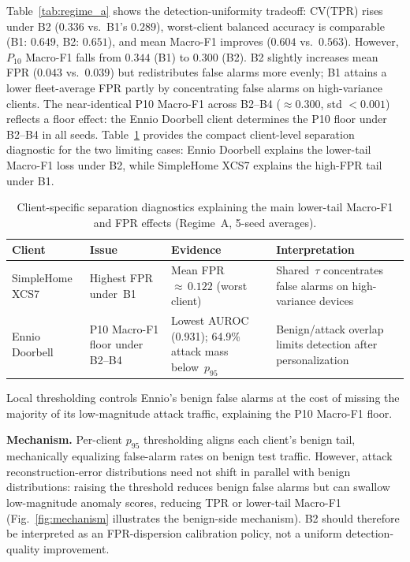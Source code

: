 Table~\ref{tab:regime_a} shows the detection-uniformity tradeoff:
CV(TPR) rises under B2 ($0.336$ vs.\ B1's $0.289$),
worst-client balanced accuracy is comparable (B1: $0.649$, B2: $0.651$),
and mean Macro-F1 improves ($0.604$ vs.\ $0.563$).
However, $P_{10}$ Macro-F1 falls from $0.344$ (B1) to $0.300$ (B2).
B2 slightly increases mean FPR ($0.043$ vs.\ $0.039$) but redistributes
false alarms more evenly; B1 attains a lower fleet-average FPR partly by concentrating
false alarms on high-variance clients.
The near-identical P10 Macro-F1 across B2--B4 ($\approx 0.300$, std $< 0.001$)
reflects a floor effect: the Ennio Doorbell client determines the P10 floor
under B2--B4 in all seeds.
Table~\ref{tab:failure_modes} provides the compact client-level separation diagnostic for the two limiting cases: Ennio Doorbell explains the lower-tail Macro-F1 loss under B2, while SimpleHome XCS7 explains the high-FPR tail under B1.

\begin{table}[t]
  \caption{Client-specific separation diagnostics explaining the main lower-tail Macro-F1 and FPR effects (Regime~A, 5-seed averages).}
  \label{tab:failure_modes}
  \centering
  \footnotesize
  \renewcommand{\arraystretch}{1.3}%
  \setlength{\tabcolsep}{4pt}%
  \begin{tabular}{@{}>{\raggedright\arraybackslash}p{1.8cm}>{\raggedright\arraybackslash}p{1.7cm}>{\raggedright\arraybackslash}p{2.0cm}>{\raggedright\arraybackslash}p{2.2cm}@{}}
    \toprule
    Client & Issue & Evidence & Interpretation \\
    \midrule
    SimpleHome XCS7 & Highest FPR under~B1 & Mean FPR ${\approx}\,0.122$ (worst client) & Shared~$\tau$ concentrates false alarms on high-variance devices \\[3pt]
    Ennio Doorbell & P10 Macro-F1 floor under B2--B4 & Lowest AUROC (0.931); 64.9\% attack mass below~$p_{95}$ & Benign/attack overlap limits detection after personalization \\
    \bottomrule
  \end{tabular}
\end{table}

Local thresholding controls Ennio's benign false alarms at the cost of
missing the majority of its low-magnitude attack traffic, explaining the P10 Macro-F1
floor.

\textbf{Mechanism.}
Per-client $p_{95}$ thresholding aligns each client's benign tail, mechanically
equalizing false-alarm rates on benign test traffic.
However, attack reconstruction-error distributions need not shift in parallel
with benign distributions: raising the threshold reduces benign false alarms
but can swallow low-magnitude anomaly scores, reducing TPR or lower-tail
Macro-F1 (Fig.~\ref{fig:mechanism} illustrates the benign-side mechanism).
B2 should therefore be interpreted as an FPR-dispersion calibration policy,
not a uniform detection-quality improvement.

